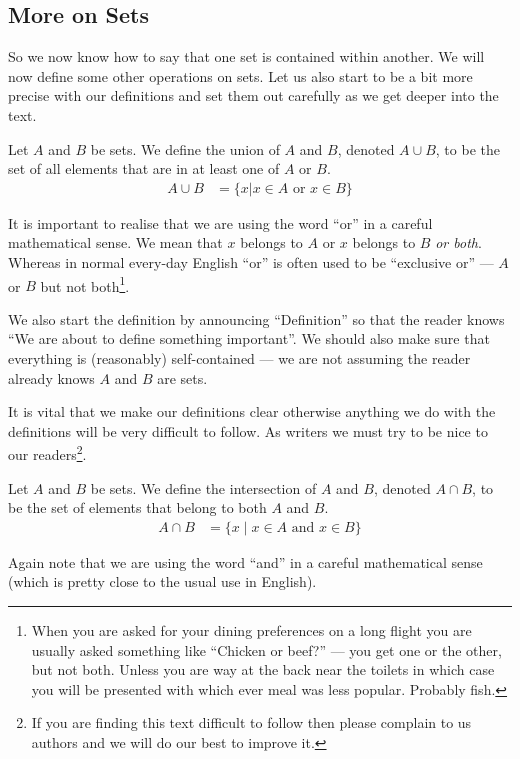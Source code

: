 \subsection*{More on Sets}
So we now know how to say that one set is contained within another. We will now
define some other operations on sets. Let us also start to be a bit more precise
with our definitions and set them out carefully as we get deeper into the
text.
\begin{defn}\label{def_0_3_3}
 Let $A$ and $B$ be sets. We define the union of $A$ and $B$, denoted $A \cup
B$, to be the set of all elements that are in at least one of $A$ or $B$.
\begin{align*}
  A \cup B &= \{x | x\in A \mbox{ or } x \in B \}
\end{align*}
\end{defn}
It is important to realise that we are using the word ``or'' in a careful
mathematical sense. We mean that $x$ belongs to $A$ or $x$ belongs to $B$
\emph{or both}. Whereas in normal every-day English ``or'' is often used to be
``exclusive or'' --- $A$ or $B$ but not both\footnote{When you are asked for
your dining preferences on a long flight you are usually asked something
like ``Chicken or beef?'' --- you get one or the other, but not both. Unless
you are way at the back near the toilets in which case you will be presented
with which ever meal was less popular. Probably fish.}.

We also start the definition by announcing ``Definition''
so that the reader knows ``We are about to define something important''. We
should also make sure that everything is (reasonably) self-contained --- we are
not assuming the reader already knows $A$ and $B$ are sets.

It is vital that we make our definitions clear otherwise anything we do with the
definitions will be very difficult to follow. As writers we must try to be nice
to our readers\footnote{If you are finding this text difficult to follow then
please complain to us authors and we will do our best to improve it.}.

\begin{defn}\label{def_0_3_4}
 Let $A$ and $B$ be sets. We define the intersection of $A$ and $B$, denoted $A
\cap B$, to be the set of elements that belong to both $A$ and $B$.
\begin{align*}
 A \cap B &= \{ x \;|\; x\in A \mbox{ and } x \in B \}
\end{align*}
\end{defn}
Again note that we are using the word ``and'' in a careful mathematical sense
(which is pretty close to the usual use in English).

